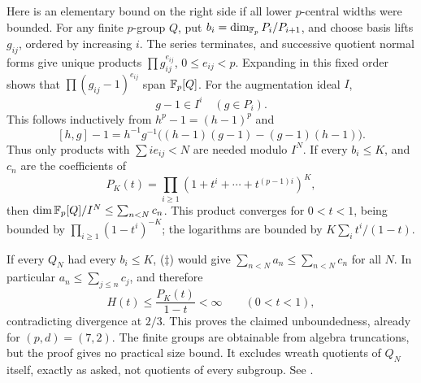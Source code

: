 Here is an elementary bound on the right side if all lower
\(p\)-central widths were bounded.
For any finite \(p\)-group \(Q\), put
\(b_i=\dim_{\mathbb F_p}P_i/P_{i+1}\), and choose basis lifts \(g_{ij}\),
ordered by increasing \(i\). The series terminates, and successive
quotient normal forms give unique products
\(\prod g_{ij}^{e_{ij}}\), \(0\le e_{ij}<p\).
Expanding in this fixed order shows that
\(\prod(g_{ij}-1)^{e_{ij}}\) span \(\mathbb F_p[Q]\).
For the augmentation ideal \(I\),
\[
 g-1\in I^i\quad(g\in P_i).
\]
This follows inductively from \(h^p-1=(h-1)^p\) and
\[
 [h,g]-1=h^{-1}g^{-1}
 \bigl((h-1)(g-1)-(g-1)(h-1)\bigr).
\]
Thus only products with \(\sum i e_{ij}<N\) are needed modulo \(I^N\).
If every \(b_i\le K\), and \(c_n\) are the coefficients of
\[
 P_K(t)=\prod_{i\ge1}(1+t^i+\cdots+t^{(p-1)i})^K,
\]
then \(\dim\mathbb F_p[Q]/I^N\le\sum_{n<N}c_n\).
This product converges for \(0<t<1\), being bounded by
\(\prod_{i\ge1}(1-t^i)^{-K}\); the logarithms are bounded by
\(K\sum_i t^i/(1-t)\).

If every \(Q_N\) had every \(b_i\le K\), (\(\ddagger\)) would give
\(\sum_{n<N}a_n\le\sum_{n<N}c_n\) for all \(N\).
In particular \(a_n\le\sum_{j\le n}c_j\), and therefore
\[
 H(t)\le\frac{P_K(t)}{1-t}<\infty\qquad(0<t<1),
\]
contradicting divergence at \(2/3\).
This proves the claimed unboundedness, already for \((p,d)=(7,2)\).
The finite groups are obtainable from algebra truncations, but the
proof gives no practical size bound. It excludes wreath quotients
of \(Q_N\) itself, exactly as asked, not quotients of every subgroup.
See .

